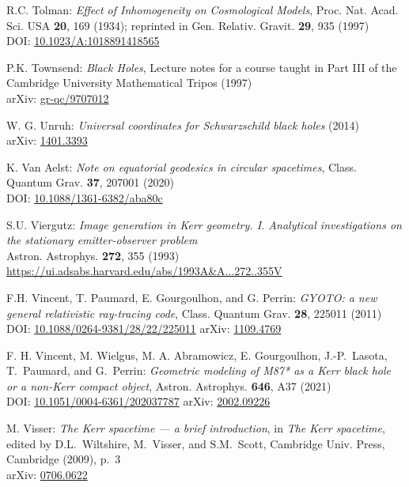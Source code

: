 \begin{thebibliography}{123}
R.C. Tolman:
{\em Effect of Inhomogeneity on Cosmological Models},
Proc. Nat. Acad. Sci. USA {\bf 20}, 169 (1934);
reprinted in Gen. Relativ. Gravit. {\bf 29}, 935 (1997)\\
DOI: \href{https://doi.org/10.1023/A:1018891418565}{10.1023/A:1018891418565}

P.K. Townsend: {\em Black Holes}, Lecture notes for a course taught in Part III
of the Cambridge University Mathematical Tripos (1997) \\
arXiv: \href{https://arxiv.org/abs/gr-qc/9707012}{gr-qc/9707012}

W. G. Unruh: {\em Universal coordinates for Schwarzschild black holes} (2014)\\
arXiv: \href{https://arxiv.org/abs/1401.3393}{1401.3393}

K. Van Aelst: {\em Note on equatorial geodesics in circular spacetimes},
Class. Quantum Grav. {\bf 37}, 207001 (2020)\\
DOI: \href{https://doi.org/10.1088/1361-6382/aba80c}{10.1088/1361-6382/aba80c}

S.U. Viergutz:
{\em Image generation in Kerr geometry. I. Analytical investigations on the stationary emitter-observer problem}\\
Astron. Astrophys. {\bf 272}, 355 (1993)\\
\url{https://ui.adsabs.harvard.edu/abs/1993A&A...272..355V}

F.H. Vincent, T. Paumard, E. Gourgoulhon, and G. Perrin:
{\em GYOTO: a new general relativistic ray-tracing code},
Class. Quantum Grav. {\bf 28}, 225011 (2011)\\
DOI: \href{https://doi.org/10.1088/0264-9381/28/22/225011}{10.1088/0264-9381/28/22/225011}
\hfill
arXiv: \href{https://arxiv.org/abs/1109.4769}{1109.4769}

F. H. Vincent, M. Wielgus, M. A. Abramowicz, E. Gourgoulhon, J.-P.~Lasota, T.~Paumard,
and G.~Perrin:
{\em Geometric modeling of M87* as a Kerr black hole or a non-Kerr compact object},
Astron. Astrophys. {\bf 646}, A37 (2021)\\
DOI: \href{https://doi.org/10.1051/0004-6361/202037787}{10.1051/0004-6361/202037787}\hfill
arXiv: \href{https://arxiv.org/abs/2002.09226}{2002.09226}

M. Visser: {\em The Kerr spacetime --- a brief introduction},
in {\em The Kerr spacetime}, edited by D.L.~Wiltshire, M.~Visser, and S.M.~Scott,
Cambridge Univ. Press, Cambridge (2009), p.~3\\
arXiv: \href{https://arxiv.org/abs/0706.0622}{0706.0622}


\end{thebibliography}
